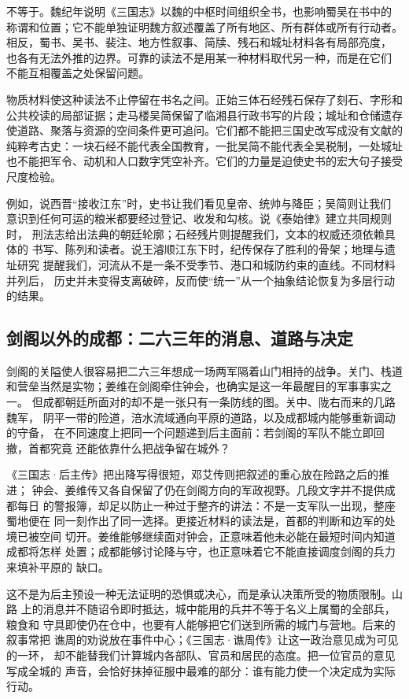 \begin{debate}
不等于。魏纪年说明《三国志》以魏的中枢时间组织全书，也影响蜀吴在书中的
称谓和位置；它不能单独证明魏方叙述覆盖了所有地区、所有群体或所有行动者。
相反，蜀书、吴书、裴注、地方性叙事、简牍、残石和城址材料各有局部亮度，
也各有无法外推的边界。可靠的读法不是用某一种材料取代另一种，而是在它们
不能互相覆盖之处保留问题。
\end{debate}

物质材料使这种读法不止停留在书名之间。正始三体石经残石保存了刻石、字形和
公共校读的局部证据；走马楼吴简保留了临湘县行政书写的片段；城址和仓储遗存
使道路、聚落与资源的空间条件更可追问。它们都不能把三国史改写成没有文献的
纯粹考古史：一块石经不能代表全国教育，一批吴简不能代表全吴税制，一处城址
也不能把军令、动机和人口数字凭空补齐。它们的力量是迫使史书的宏大句子接受
尺度检验。

例如，说西晋“接收江东”时，史书让我们看见皇帝、统帅与降臣；吴简则让我们
意识到任何可运的粮米都要经过登记、收发和勾核。说《泰始律》建立共同规则时，
刑法志给出法典的朝廷轮廓；石经残片则提醒我们，文本的权威还须依赖具体的
书写、陈列和读者。说王濬顺江东下时，纪传保存了胜利的骨架；地理与遗址研究
提醒我们，河流从不是一条不受季节、港口和城防约束的直线。不同材料并列后，
历史并未变得支离破碎，反而使“统一”从一个抽象结论恢复为多层行动的结果。

\subsection{剑阁以外的成都：二六三年的消息、道路与决定}

剑阁的关隘使人很容易把二六三年想成一场两军隔着山门相持的战争。关门、栈道
和营垒当然是实物；姜维在剑阁牵住钟会，也确实是这一年最醒目的军事事实之一。
但成都朝廷所面对的却不是一张只有一条防线的图。关中、陇右而来的几路魏军，
阴平一带的险道，涪水流域通向平原的道路，以及成都城内能够重新调动的守备，
在不同速度上把同一个问题递到后主面前：若剑阁的军队不能立即回撤，首都究竟
还能依靠什么把战争留在城外？

《三国志·后主传》把出降写得很短，邓艾传则把叙述的重心放在险路之后的推进；
钟会、姜维传又各自保留了仍在剑阁方向的军政视野。几段文字并不提供成都每日
的警报簿，却足以防止一种过于整齐的讲法：不是一支军队一出现，整座蜀地便在
同一刻作出了同一选择。更接近材料的读法是，首都的判断和边军的处境已被空间
切开。姜维能够继续面对钟会，正意味着他未必能在最短时间内知道成都将怎样
处置；成都能够讨论降与守，也正意味着它不能直接调度剑阁的兵力来填补平原的
缺口。

这不是为后主预设一种无法证明的恐惧或决心，而是承认决策所受的物质限制。山路
上的消息并不随诏令即时抵达，城中能用的兵并不等于名义上属蜀的全部兵，粮食和
守具即使仍在仓中，也要有人能够把它们送到所需的城门与营地。后来的叙事常把
谯周的劝说放在事件中心；《三国志·谯周传》让这一政治意见成为可见的一环，
却不能替我们计算城内各部队、官员和居民的态度。把一位官员的意见写成全城的
声音，会恰好抹掉征服中最难的部分：谁有能力使一个决定成为实际行动。

